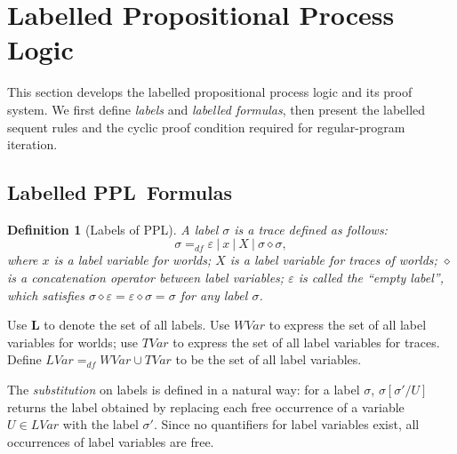 \documentclass[manuscript,screen]{acmart}
\newtheorem{definition}{Definition}[section]
\newcommand{\bff}[1]{\mathbf{#1}}
\newcommand{\mcl}[1]{\mathcal{#1}}
\newcommand{\mfr}[1]{\mathfrak{#1}}
\newcommand{\dddef}[0]{=_{df}}
\newcommand{\Conf}[0]{\bff{L}}
\newcommand{\lm}[0]{\mfr{m}}
\newcommand{\cat}[0]{\diamond}
\newcommand{\Wd}[0]{\mcl{S}}
\newcommand{\I}[0]{\mcl{I}}
\newcommand{\LM}[0]{\bff{M}}
\newcommand{\LVar}[0]{\mathit{LVar}}
\newcommand{\WVar}[0]{\textit{WVar}}
\newcommand{\TVar}[0]{\textit{TVar}}
\newcommand{\PPL}[0]{\mbox{PPL}}
\begin{document}
\section{Labelled Propositional Process Logic}
\label{section:Labelled Propositional Process Logic}
This section develops the labelled propositional process logic and its proof system.  We first define \emph{labels} and \emph{labelled formulas}, then present the labelled sequent rules and the cyclic proof condition required for regular-program iteration.

\subsection{Labelled \PPL\ Formulas}
\label{section:Labelled PPL Formulas}

\begin{definition}[Labels of \PPL]
\label{def:Labels and Label Mappings}
A label $\sigma$ is a trace defined as follows:
$$
\sigma \dddef \varepsilon\ |\ x\ |\ X\ |\ \sigma\cat \sigma, 
$$
where $x$ is a label variable for worlds; $X$ is a label variable for traces of worlds;
$\cat$ is a concatenation operator between label variables; 
$\varepsilon$ is called the ``empty label'', which satisfies $\sigma \cat \varepsilon = \varepsilon\cat \sigma = \sigma$ for any label $\sigma$. 

\end{definition}

Use $\Conf$ to denote the set of all labels. 
Use $\WVar$ to express the set of all label variables for worlds; use $\TVar$ to express the set of all label variables for traces. 
Define $\LVar\dddef \WVar\cup \TVar$ to be the set of all label variables. 

The \emph{substitution} on labels is defined in a natural way: for a label $\sigma$, $\sigma[\sigma'/U]$ returns the label obtained by replacing each free occurrence of a variable $U\in \LVar$ with the label $\sigma'$. 
Since no quantifiers for label variables exist, all occurrences of label variables are free. 
\end{document}
